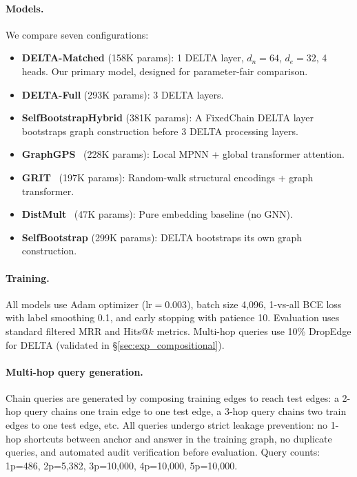 \documentclass{article}
\begin{document}
\paragraph{Models.} We compare seven configurations:
\begin{itemize}
    \item \textbf{DELTA-Matched} (158K params): 1 DELTA layer, $d_n{=}64$, $d_e{=}32$, 4 heads. Our primary model, designed for parameter-fair comparison.
    \item \textbf{DELTA-Full} (293K params): 3 DELTA layers.
    \item \textbf{SelfBootstrapHybrid} (381K params): A FixedChain DELTA layer bootstraps graph construction before 3 DELTA processing layers.
    \item \textbf{GraphGPS}~\cite{rampavsek2022recipe} (228K params): Local MPNN + global transformer attention.
    \item \textbf{GRIT}~\cite{ma2023graph} (197K params): Random-walk structural encodings + graph transformer.
    \item \textbf{DistMult}~\cite{yang2015embedding} (47K params): Pure embedding baseline (no GNN).
    \item \textbf{SelfBootstrap} (299K params): DELTA bootstraps its own graph construction.
\end{itemize}

\paragraph{Training.} All models use Adam optimizer ($\text{lr}=0.003$), batch size 4,096, 1-vs-all BCE loss with label smoothing 0.1, and early stopping with patience 10. Evaluation uses standard filtered MRR and Hits@$k$ metrics. Multi-hop queries use 10\% DropEdge for DELTA (validated in \S\ref{sec:exp_compositional}).

\paragraph{Multi-hop query generation.} Chain queries are generated by composing training edges to reach test edges: a 2-hop query chains one train edge to one test edge, a 3-hop query chains two train edges to one test edge, etc. All queries undergo strict leakage prevention: no 1-hop shortcuts between anchor and answer in the training graph, no duplicate queries, and automated audit verification before evaluation. Query counts: 1p=486, 2p=5,382, 3p=10,000, 4p=10,000, 5p=10,000.
\end{document}
